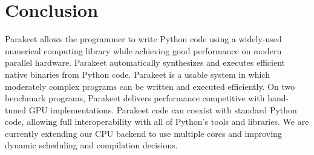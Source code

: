 \documentclass[10pt,twocolumn]{article}
\begin{document}

\section{Conclusion}
\label{Conclusion}
Parakeet allows the programmer to write Python code using a widely-used numerical computing library while achieving good performance on modern parallel hardware. 
Parakeet automatically synthesizes and executes efficient native binaries from Python code. Parakeet is a usable system in which moderately complex programs can be written and executed efficiently.  
On two benchmark programs, Parakeet delivers performance competitive with hand-tuned GPU implementations.  Parakeet code can coexist with standard Python code, allowing full interoperability with all of Python's tools and libraries.
We are currently extending our CPU backend to use multiple cores and improving dynamic scheduling and compilation decisions. 
{\small

{}
}
\end{document}
